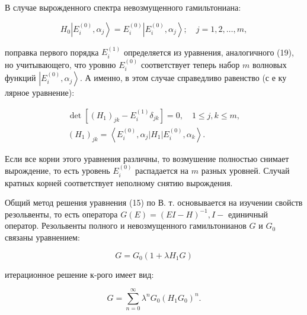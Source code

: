 \documentclass[10pt]{article}
\begin{document}
В случае вырожденного спектра невозмущенного гамильтониана:



\[

H_{0}\left|E_{i}^{(0)}, \alpha_{j}\right\rangle=E_{i}^{(0)}\left|E_{i}^{(0)}, \alpha_{j}\right\rangle ; \quad j=1,2, \ldots, m,

\]



поправка первого порядка $E_{i}^{(1)}$ определяется из уравнения, аналогичного (19), но учитывающего, что уровню $E_{i}^{(0)}$ соответствует теперь набор $m$ волновых функций $\left|E_{i}^{(0)}, \alpha_{j}\right\rangle$. А именно, в этом случае справедливо равенство (с е ку лярное уравнение):



\[

\begin{gathered}

\operatorname{det}\left[\left(H_{1}\right)_{j k}-E_{i}^{(1)} \delta_{j k}\right]=0, \quad 1 \leqslant j, k \leqslant m, \\

\left(H_{1}\right)_{j k}=\left\langle E_{i}^{(0)}, \alpha_{j}\left|H_{1}\right| E_{i}^{(0)}, \alpha_{k}\right\rangle .

\end{gathered}

\]



Если все корни этого уравнения различны, то возмушение полностью снимает вырождение, то есть уровень $E_{i}^{(0)}$ распадается на $m$ разных уровней. Случай кратных корней соответствует неполному снятию вырождения.



Общий метод решения уравнения (15) по В. т. основывается на изучении свойств резольвенты, то есть оператора $G(E)=(E I-H)^{-1}, I-$ единичный оператор. Резольвенты полного и невозмущенного гамильтонианов $G$ и $G_{0}$ связаны уравнением:



\[

G=G_{0}\left(1+\lambda H_{1} G\right)

\]



итерационное решение к-рого имеет вид:



\[

G=\sum_{n=0}^{\infty} \lambda^{n} G_{0}\left(H_{1} G_{0}\right)^{n} .

\]
\end{document}
